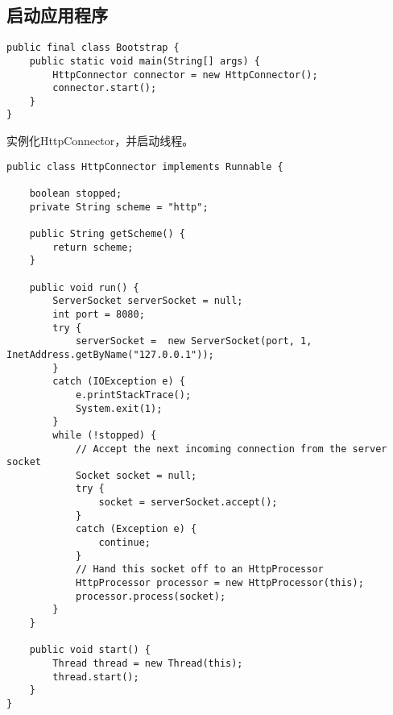 \subsection{启动应用程序}
\begin{lstlisting}
public final class Bootstrap {
	public static void main(String[] args) {
		HttpConnector connector = new HttpConnector();
		connector.start();
	}
}
\end{lstlisting}
实例化HttpConnector，并启动线程。
\begin{lstlisting}
public class HttpConnector implements Runnable {
	
	boolean stopped;
	private String scheme = "http";
	
	public String getScheme() {
		return scheme;
	}
	
	public void run() {
		ServerSocket serverSocket = null;
		int port = 8080;
		try {
			serverSocket =  new ServerSocket(port, 1, InetAddress.getByName("127.0.0.1"));
		}
		catch (IOException e) {
			e.printStackTrace();
			System.exit(1);
		}
		while (!stopped) {
			// Accept the next incoming connection from the server socket
			Socket socket = null;
			try {
				socket = serverSocket.accept();
			}
			catch (Exception e) {
				continue;
			}
			// Hand this socket off to an HttpProcessor
			HttpProcessor processor = new HttpProcessor(this);
			processor.process(socket);
		}
	}
	
	public void start() {
		Thread thread = new Thread(this);
		thread.start();
	}
}
\end{lstlisting}
